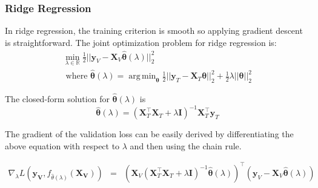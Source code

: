 \documentclass[10pt,letterpaper]{article}
\DeclareMathOperator*{\argmin}{arg\,min}
\begin{document}
\subsubsection{Ridge Regression}

In ridge regression, the training criterion is smooth so applying gradient descent is straightforward. The joint optimization problem for ridge regression is:
\begin{equation}
\begin{array}{c}
\min_{\lambda\in \mathbb{R}} \frac{1}{2} \lvert\lvert \boldsymbol{y}_V - \boldsymbol{X}_V \hat{\boldsymbol{\theta}} (\lambda) \rvert\rvert_2 ^2 \\
\text{  where  } \hat{\boldsymbol{\theta}} (\lambda) = \argmin_{\boldsymbol{\theta}} \frac{1}{2} \lvert\lvert \boldsymbol{y}_T - \boldsymbol{X}_T \boldsymbol{\theta} \rvert\rvert_2 ^2 + \frac{1}{2} \lambda \lvert\lvert \boldsymbol{\theta} \rvert\rvert_2^2
\end{array}
\end{equation}

The closed-form solution for $\hat{\boldsymbol{\theta}}(\lambda)$ is
\begin{equation}
\hat{\boldsymbol{\theta}} (\lambda) = (\boldsymbol{X}_T^\top\boldsymbol{X}_T + \lambda \boldsymbol{I})^{-1}\boldsymbol{X}_T^\top\boldsymbol{y}_T
\end{equation}

The gradient of the validation loss can be easily derived by differentiating the above equation with respect to $\lambda$ and then using the chain rule.

\begin{equation}
\begin{array} {lcl}
\nabla_{\lambda} L(\boldsymbol{y_V}, f_{\hat \theta(\lambda)}(\boldsymbol{X_V}))
&=& (\boldsymbol{X}_V(\boldsymbol{X}_T^\top \boldsymbol{X}_T + \lambda \boldsymbol{I})^{-1}
\hat{\boldsymbol{\theta}}(\lambda))^{\top}
(\boldsymbol{y}_V - \boldsymbol{X}_V \hat{\boldsymbol{\theta}}(\lambda))
\end{array}
\end{equation}
\end{document}
